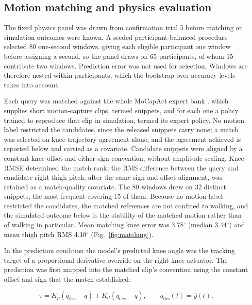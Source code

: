 \documentclass[referee,lineno,pdflatex,sn-vancouver-num]{sn-jnl}
\begin{document}
\subsection{Motion matching and physics evaluation}

The fixed physics panel was drawn from confirmation trial 5 before matching or
simulation outcomes were known. A seeded participant-balanced procedure selected
80 one-second windows, giving each eligible participant one
window before assigning a second, so the panel draws on
65 participants, of whom 15 contribute two
windows. Prediction error was not used for selection. Windows are therefore
nested within participants, which the bootstrap over accuracy levels takes into
account.

Each query was matched against the whole MoCapAct expert bank
\cite{wagener2022}, which supplies short motion-capture clips, termed snippets,
and for each one a policy trained to reproduce that clip in simulation, termed
its expert policy. No motion label restricted the candidates, since the released
snippets carry none; a match was selected on knee-trajectory agreement alone,
and the agreement achieved is reported below and carried as a covariate. Candidate snippets were aligned by a constant knee offset and
either sign convention, without amplitude scaling. Knee RMSE determined the match
rank; the RMS difference between the query and candidate right-thigh pitch,
after the same sign and offset alignment, was retained as a match-quality
covariate. The 80 windows drew on 32 distinct
snippets, the most frequent covering 15 of them. Because no
motion label restricted the candidates, the matched references are not confined
to walking, and the simulated outcome below is the stability of the matched
motion rather than of walking in particular. Mean
matching knee error was 3.78$^{\circ}$
(median 3.44$^{\circ}$) and mean thigh
pitch RMS 4.10$^{\circ}$
(Fig.~\ref{fig:matching}).

In the prediction condition the model's predicted knee angle was the tracking
target of a proportional-derivative override on the right knee actuator. The
prediction was first mapped into the matched clip's convention using the constant
offset and sign that the match established:

\begin{equation}
\tau=K_p(q_{\mathrm{des}}-q)+K_d(\dot q_{\mathrm{des}}-\dot q),
\qquad q_{\mathrm{des}}(t)=\hat y(t).
\label{eq:control}
\end{equation}
\end{document}
